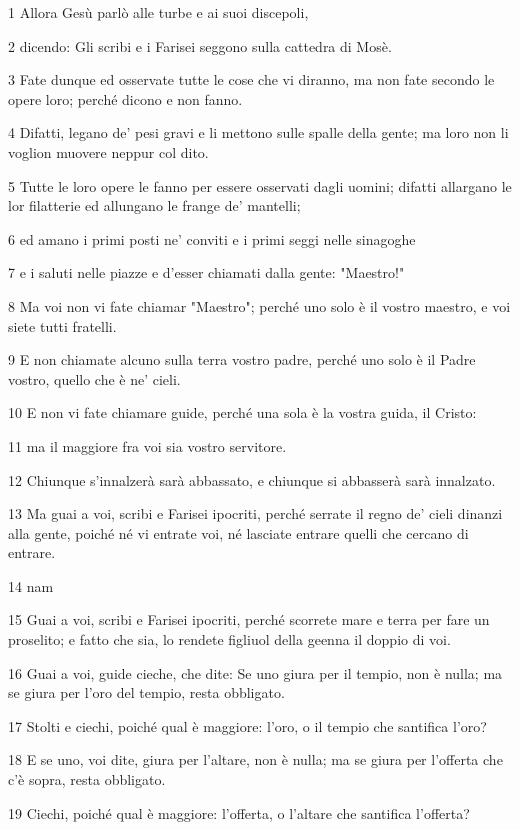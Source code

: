 \par 1 Allora Gesù parlò alle turbe e ai suoi discepoli,
\par 2 dicendo: Gli scribi e i Farisei seggono sulla cattedra di Mosè.
\par 3 Fate dunque ed osservate tutte le cose che vi diranno, ma non fate secondo le opere loro; perché dicono e non fanno.
\par 4 Difatti, legano de' pesi gravi e li mettono sulle spalle della gente; ma loro non li voglion muovere neppur col dito.
\par 5 Tutte le loro opere le fanno per essere osservati dagli uomini; difatti allargano le lor filatterie ed allungano le frange de' mantelli;
\par 6 ed amano i primi posti ne' conviti e i primi seggi nelle sinagoghe
\par 7 e i saluti nelle piazze e d'esser chiamati dalla gente: "Maestro!"
\par 8 Ma voi non vi fate chiamar "Maestro"; perché uno solo è il vostro maestro, e voi siete tutti fratelli.
\par 9 E non chiamate alcuno sulla terra vostro padre, perché uno solo è il Padre vostro, quello che è ne' cieli.
\par 10 E non vi fate chiamare guide, perché una sola è la vostra guida, il Cristo:
\par 11 ma il maggiore fra voi sia vostro servitore.
\par 12 Chiunque s'innalzerà sarà abbassato, e chiunque si abbasserà sarà innalzato.
\par 13 Ma guai a voi, scribi e Farisei ipocriti, perché serrate il regno de' cieli dinanzi alla gente, poiché né vi entrate voi, né lasciate entrare quelli che cercano di entrare.
\par 14 nam
\par 15 Guai a voi, scribi e Farisei ipocriti, perché scorrete mare e terra per fare un proselito; e fatto che sia, lo rendete figliuol della geenna il doppio di voi.
\par 16 Guai a voi, guide cieche, che dite: Se uno giura per il tempio, non è nulla; ma se giura per l'oro del tempio, resta obbligato.
\par 17 Stolti e ciechi, poiché qual è maggiore: l'oro, o il tempio che santifica l'oro?
\par 18 E se uno, voi dite, giura per l'altare, non è nulla; ma se giura per l'offerta che c'è sopra, resta obbligato.
\par 19 Ciechi, poiché qual è maggiore: l'offerta, o l'altare che santifica l'offerta?
